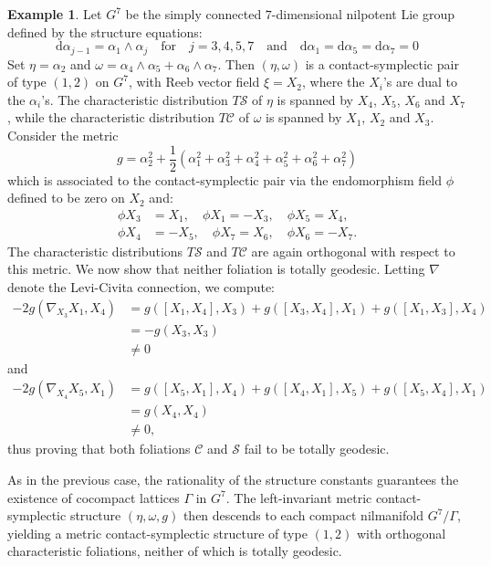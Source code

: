 \documentclass[12pt]{amsart}
\theoremstyle{definition}
\newtheorem{example}[theorem]{Example}
\theoremstyle{remark}
\begin{document}
\begin{example}
Let $G^7$ be the simply connected $7$-dimensional nilpotent Lie group defined by the structure equations:
 \begin{equation*}
 \mathrm{d}\alpha_{j-1}=\alpha_1\wedge \alpha_j \quad  \text{for} \quad  j=3,4,5,7\quad \text{and}\quad
 \mathrm{d}\alpha_1= \mathrm{d}\alpha_5= \mathrm{d}\alpha_7=0
  \end{equation*}
Set $\eta=\alpha_2$ and $\omega= \alpha_4\wedge \alpha_5+\alpha_6\wedge \alpha_7$. 
Then  $(\eta, \omega)$  is a contact-symplectic pair of type $(1,2)$ on  $G^7$,  with Reeb vector field $\xi=X_2$,  where the $X_i$'s are  dual to the $\alpha_i$'s.
The characteristic distribution $T\mathcal{S}$ of $\eta$  is spanned by $X_4$, $X_5$, $X_6$ and $X_7$, while  the characteristic distribution  $T\mathcal{C}$ of  $\omega$ is spanned by $X_1$, $X_2$ and $X_3$.
Consider the metric
 \begin{equation*}
g=\alpha_2^2+\frac{1}{2}\left( \alpha_1^2+\alpha_3^2+\alpha_4^2+\alpha_5^2 +\alpha_6^2+\alpha_7^2\right)
 \end{equation*}
which is associated to the contact-symplectic pair via the endomorphism field $\phi$ defined to be zero on $X_2$ and:
\begin{align*}
\phi X_ 3&=X_1 ,\quad \phi X_1 =-X_3 , \quad \phi X_ 5=X_4,\\
\phi X_4 &=-X_5 , \quad \phi X_ 7=X_6,\quad \phi X_6 =-X_7.
  \end{align*}
 The characteristic distributions $T\mathcal{S}$ and $T\mathcal{C}$ are again orthogonal with respect to this metric.
We now show that neither foliation is totally geodesic.
Letting $\nabla$ denote the Levi-Civita connection, we compute:
\begin{align*}
 	  -2 g(\nabla_{X_3}X_1, X_4 )&=   g([X_1,X_4],X_3) + g([X_3,X_4],X_1)+g([X_1,X_3],X_4)   \\
	                                              &= -g(X_3,X_3) \\
	                                              &\neq 0
  \end{align*}
  and
  \begin{align*}
 	  -2 g(\nabla_{X_4}X_5, X_1)&=   g([X_5,X_1],X_4)  +g([X_4,X_1],X_5) +  g([X_5,X_4],X_1)   \\
	                                              &= g(X_4,X_4)  \\
	                                              &\neq 0,                       
  \end{align*}
thus proving that both foliations $\mathcal{C}$ and $\mathcal{S}$ fail to be totally geodesic.

\medskip 
\noindent
As in the previous case, the rationality of the structure constants guarantees the existence of cocompact lattices $\Gamma$ in $G^7$. The left-invariant metric contact-symplectic structure $(\eta, \omega, g)$ then descends to each compact nilmanifold $G^7/\Gamma$, yielding a metric contact-symplectic structure of type $(1,2)$ with orthogonal characteristic foliations, neither of which is totally geodesic.

\end{example}
\end{document}
